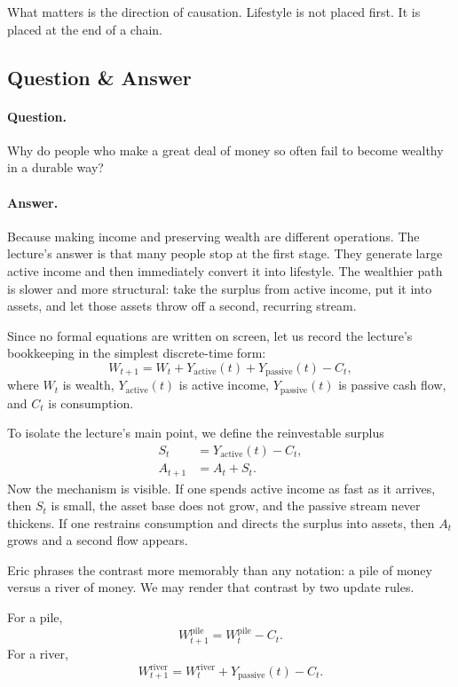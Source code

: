 What matters is the direction of causation. Lifestyle is not placed first. It is placed at the end of a chain.

\subsection{Question \& Answer}

\paragraph{Question.} Why do people who make a great deal of money so often fail to become wealthy in a durable way?

\paragraph{Answer.} Because making income and preserving wealth are different operations. The lecture's answer is that many people stop at the first stage. They generate large active income and then immediately convert it into lifestyle. The wealthier path is slower and more structural: take the surplus from active income, put it into assets, and let those assets throw off a second, recurring stream.

Since no formal equations are written on screen, let us record the lecture's bookkeeping in the simplest discrete-time form:
\begin{equation}
W_{t+1}=W_t+Y_{\mathrm{active}}(t)+Y_{\mathrm{passive}}(t)-C_t,
\end{equation}
where \(W_t\) is wealth, \(Y_{\mathrm{active}}(t)\) is active income, \(Y_{\mathrm{passive}}(t)\) is passive cash flow, and \(C_t\) is consumption.

To isolate the lecture's main point, we define the reinvestable surplus
\begin{align}
S_t &= Y_{\mathrm{active}}(t)-C_t,\\
A_{t+1} &= A_t+S_t.
\end{align}
Now the mechanism is visible. If one spends active income as fast as it arrives, then \(S_t\) is small, the asset base does not grow, and the passive stream never thickens. If one restrains consumption and directs the surplus into assets, then \(A_t\) grows and a second flow appears.

Eric phrases the contrast more memorably than any notation: a pile of money versus a river of money. We may render that contrast by two update rules.

For a pile,
\begin{equation}
W_{t+1}^{\mathrm{pile}}=W_t^{\mathrm{pile}}-C_t.
\end{equation}
For a river,
\begin{equation}
W_{t+1}^{\mathrm{river}}=W_t^{\mathrm{river}}+Y_{\mathrm{passive}}(t)-C_t.
\end{equation}

